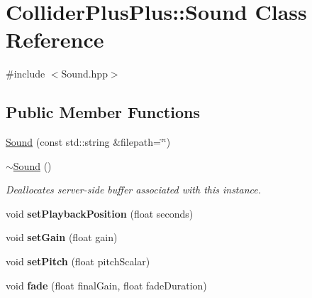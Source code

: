 \hypertarget{classColliderPlusPlus_1_1Sound}{\section{Collider\-Plus\-Plus\-:\-:Sound Class Reference}
\label{classColliderPlusPlus_1_1Sound}
}


{\ttfamily \#include $<$Sound.\-hpp$>$}

\subsection*{Public Member Functions}
\begin{DoxyCompactItemize}
\item 
\hyperlink{classColliderPlusPlus_1_1Sound_a21450f1e1b863970c556f07678908560}{Sound} (const std\-::string \&filepath=\char`\"{}\char`\"{})
\item 
\hypertarget{classColliderPlusPlus_1_1Sound_a0ae9f80837e343e016952def28815072}{\hyperlink{classColliderPlusPlus_1_1Sound_a0ae9f80837e343e016952def28815072}{$\sim$\-Sound} ()}\label{classColliderPlusPlus_1_1Sound_a0ae9f80837e343e016952def28815072}

\begin{DoxyCompactList}\small\item\em Deallocates server-\/side buffer associated with this instance. \end{DoxyCompactList}\item 
\hypertarget{classColliderPlusPlus_1_1Sound_aa399d67d29cb8085a3af4c9e5d920482}{void {\bfseries set\-Playback\-Position} (float seconds)}\label{classColliderPlusPlus_1_1Sound_aa399d67d29cb8085a3af4c9e5d920482}

\item 
\hypertarget{classColliderPlusPlus_1_1Sound_ab64f46659f59a6d7b7bc206cca6402cf}{void {\bfseries set\-Gain} (float gain)}\label{classColliderPlusPlus_1_1Sound_ab64f46659f59a6d7b7bc206cca6402cf}

\item 
\hypertarget{classColliderPlusPlus_1_1Sound_a294e50c05c4303918110ba493fedd42e}{void {\bfseries set\-Pitch} (float pitch\-Scalar)}\label{classColliderPlusPlus_1_1Sound_a294e50c05c4303918110ba493fedd42e}

\item 
\hypertarget{classColliderPlusPlus_1_1Sound_aaf0f1826c66e65f7f25d5a0f87e2d2a2}{void {\bfseries fade} (float final\-Gain, float fade\-Duration)}\label{classColliderPlusPlus_1_1Sound_aaf0f1826c66e65f7f25d5a0f87e2d2a2}

\end{DoxyCompactItemize}
